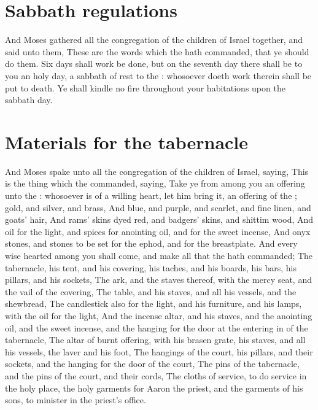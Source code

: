 \section*{Sabbath regulations}
\begin{biblechapter} %
\verse And Moses gathered all the congregation of the children of Israel together, and said unto them, These are the words which the \LORD hath commanded, that ye should do them.
\verse Six days shall work be done, but on the seventh day there shall be to you an holy day, a sabbath of rest to the \LORD: whosoever doeth work therein shall be put to death.
\verse Ye shall kindle no fire throughout your habitations upon the sabbath day.
\section*{Materials for the tabernacle}
\verse And Moses spake unto all the congregation of the children of Israel, saying, This is the thing which the \LORD commanded, saying,
\verse Take ye from among you an offering unto the \LORD: whosoever is of a willing heart, let him bring it, an offering of the \LORD; gold, and silver, and brass,
\verse And blue, and purple, and scarlet, and fine linen, and goats' hair,
\verse And rams' skins dyed red, and badgers' skins, and shittim wood,
\verse And oil for the light, and spices for anointing oil, and for the sweet incense,
\verse And onyx stones, and stones to be set for the ephod, and for the breastplate.
\verse And every wise hearted among you shall come, and make all that the \LORD hath commanded;
\verse The tabernacle, his tent, and his covering, his taches, and his boards, his bars, his pillars, and his sockets,
\verse The ark, and the staves thereof, with the mercy seat, and the vail of the covering,
\verse The table, and his staves, and all his vessels, and the shewbread,
\verse The candlestick also for the light, and his furniture, and his lamps, with the oil for the light,
\verse And the incense altar, and his staves, and the anointing oil, and the sweet incense, and the hanging for the door at the entering in of the tabernacle,
\verse The altar of burnt offering, with his brasen grate, his staves, and all his vessels, the laver and his foot,
\verse The hangings of the court, his pillars, and their sockets, and the hanging for the door of the court,
\verse The pins of the tabernacle, and the pins of the court, and their cords,
\verse The cloths of service, to do service in the holy place, the holy garments for Aaron the priest, and the garments of his sons, to minister in the priest's office.

\end{biblechapter}
